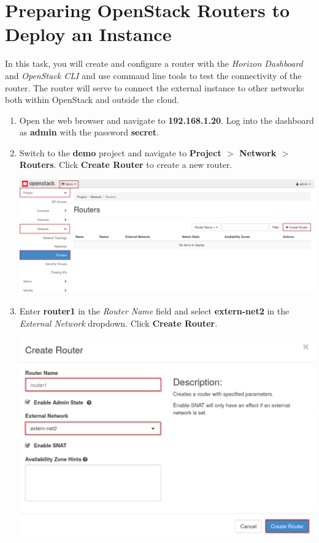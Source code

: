 \documentclass[letterpaper, 12pt]{article}
\begin{document}
\section{Preparing OpenStack Routers to Deploy an Instance}
\label{sec:preparing_openstack_routers_to_deploy_an_instance}
In this task, you will create and configure a router with the \textit{Horizon Dashboard} and \textit{OpenStack CLI} and use command line tools to test the connectivity of the router.
The router will serve to connect the external instance to other networks both within OpenStack and outside the cloud.

\begin{enumerate}
    \item Open the web browser and navigate to \textbf{192.168.1.20}.
    Log into the dashboard as \textbf{admin} with the password \textbf{secret}.

    \item Switch to the \textbf{demo} project and navigate to \textbf{Project $>$ Network $>$ Routers}.
    Click \textbf{Create Router} to create a new router.

    \begin{center}
        \includegraphics[width=\linewidth]{images/part2/step2.png}
    \end{center}

    \item Enter \textbf{router1} in the \textit{Router Name} field and select \textbf{extern-net2} in the \textit{External Network} dropdown.
    Click \textbf{Create Router}.

    \begin{center}
        \includegraphics[width=\linewidth]{images/part2/step3.png}
    \end{center}


\end{enumerate}
\end{document}
